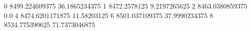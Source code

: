 0 8499.224609375 36.1865234375
1 8472.2578125 9.2197265625
2 8463.0380859375 0.0
4 8474.6201171875 11.58203125
6 8501.037109375 37.9990234375
8 8534.775390625 71.7373046875
